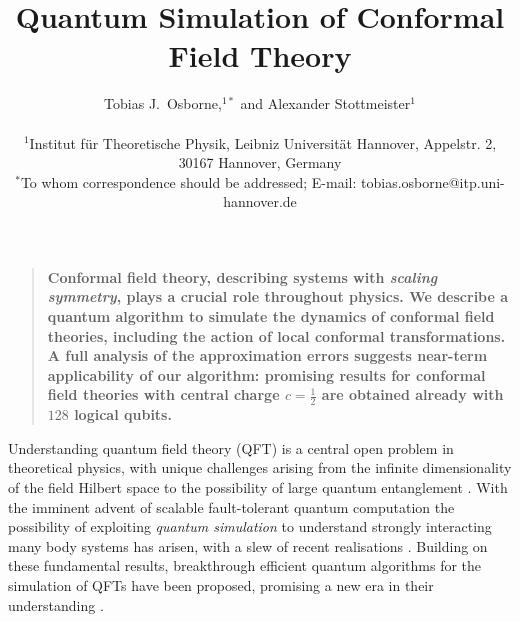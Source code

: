 \documentclass[12pt]{article}
\title{Quantum Simulation of Conformal Field Theory}
\author
{Tobias J.\ Osborne,$^{1\ast}$ and Alexander Stottmeister$^{1}$\\
\\
\normalsize{$^{1}$Institut f\"ur Theoretische Physik, Leibniz Universit\"at Hannover, Appelstr. 2, 30167 Hannover, Germany}\\
\normalsize{$^\ast$To whom correspondence should be addressed; E-mail: 
tobias.osborne@itp.uni-hannover.de}
}
\date{}
\newenvironment{sciabstract}{%
\begin{quote} \bf}
{\end{quote}}
\newcommand{\1}{\mathds{1}}
\begin{document}
 


\baselineskip24pt


\maketitle 




\begin{sciabstract}
  Conformal field theory, describing systems with \emph{scaling symmetry}, plays a crucial role throughout physics. We describe a quantum algorithm to simulate the dynamics of conformal field theories, including the action of local conformal transformations. A full analysis of the approximation errors suggests near-term applicability of our algorithm: promising results for conformal field theories with central charge $c=\frac12$ are obtained already with $128$ logical qubits. 
\end{sciabstract}

Understanding quantum field theory (QFT) is a central open problem in theoretical physics, with unique challenges arising from the infinite dimensionality of the field Hilbert space to the possibility of large quantum entanglement \cite{douglasFoundationsQuantumField2012,seibergNathanSeiberg20152014,wittenAPSMedalExceptional2018}. With the imminent advent of scalable fault-tolerant quantum computation the possibility of exploiting \emph{quantum simulation} \cite{feynmanSimulatingPhysicsComputers1981,lloydUniversalQuantumSimulators1996,abramsSimulationManyBodyFermi1997a,zalkaSimulatingQuantumSystems1998} to understand strongly interacting many body systems has arisen, with a slew of recent realisations \cite{smithSimulatingQuantumManybody2019,zhangObservationManybodyDynamical2017,bernienProbingManybodyDynamics2017}. Building on these fundamental results, breakthrough efficient quantum algorithms for the simulation of QFTs have been proposed, promising a new era in their understanding \cite{jordanQuantumAlgorithmsQuantum2012,hamedmoosavianFasterQuantumAlgorithm2018,jordanQuantumAlgorithmsFermionic2014,preskillSimulatingQuantumField2018}. 
\end{document}
